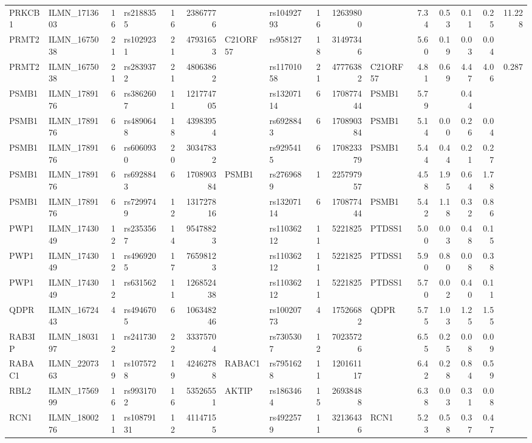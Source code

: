 \documentclass{article}
\begin{document}
\begin{landscape}
{\begin{ThreePartTable}
\begin{longtable}{|llr|lrrl|lrrl|rrrr|r|}
PRKCB1 & ILMN\_1713603 & 16 & rs2188355 & 16 & 23867776 &  & rs10492793 & 16 & 12639800 &  & 7.34 & 0.53 & 0.11 & 0.25 & 11.228 \\
PRMT2 & ILMN\_1675038 & 21 & rs1029231 & 21 & 47931653 & C21ORF57 & rs958127 & 18 & 31497346 &  & 5.60 & 0.19 & 0.03 & 0.04 &  \\
PRMT2 & ILMN\_1675038 & 21 & rs2839372 & 21 & 48063862 &  & rs11701058 & 21 & 47776382 & C21ORF57 & 4.81 & 0.69 & 4.47 & 4.06 & 0.287 \\
PSMB1 & ILMN\_1789176 & 6 & rs3862607 & 11 & 121774705 &  & rs13207114 & 6 & 170877444 & PSMB1 & 5.79 &  & 0.44 &  &  \\
PSMB1 & ILMN\_1789176 & 6 & rs4890648 & 18 & 43983954 &  & rs6928843 & 6 & 170890384 & PSMB1 & 5.14 & 0.00 & 0.26 & 0.04 &  \\
PSMB1 & ILMN\_1789176 & 6 & rs6060930 & 20 & 30347832 &  & rs9295415 & 6 & 170823379 & PSMB1 & 5.44 & 0.44 & 0.21 & 0.27 &  \\
PSMB1 & ILMN\_1789176 & 6 & rs6928843 & 6 & 170890384 & PSMB1 & rs2769689 & 1 & 225797957 &  & 4.58 & 1.95 & 0.64 & 1.78 &  \\
PSMB1 & ILMN\_1789176 & 6 & rs7299749 & 12 & 131727816 &  & rs13207114 & 6 & 170877444 & PSMB1 & 5.42 & 1.18 & 0.32 & 0.86 &  \\
PWP1 & ILMN\_1743049 & 12 & rs2353567 & 14 & 95478823 &  & rs11036212 & 11 & 5221825 & PTDSS1 & 5.00 & 0.03 & 0.48 & 0.15 &  \\
PWP1 & ILMN\_1743049 & 12 & rs4969205 & 17 & 76598123 &  & rs11036212 & 11 & 5221825 & PTDSS1 & 5.90 & 0.80 & 0.08 & 0.38 &  \\
PWP1 & ILMN\_1743049 & 12 & rs631562 & 11 & 126852438 &  & rs11036212 & 11 & 5221825 & PTDSS1 & 5.70 & 0.02 & 0.40 & 0.11 &  \\
QDPR & ILMN\_1672443 & 4 & rs4946705 & 6 & 106348246 &  & rs10020773 & 4 & 17526682 & QDPR & 5.75 & 1.03 & 1.25 & 1.55 &  \\
RAB3IP & ILMN\_1803197 & 12 & rs241730 & 22 & 33375704 &  & rs7305307 & 12 & 70235726 &  & 6.55 & 0.25 & 0.08 & 0.09 &  \\
RABAC1 & ILMN\_2207363 & 19 & rs1075728 & 19 & 42462788 & RABAC1 & rs7951628 & 11 & 120161117 &  & 6.42 & 0.28 & 0.84 & 0.59 &  \\
RBL2 & ILMN\_1756999 & 16 & rs9931702 & 16 & 53526551 & AKTIP & rs1863464 & 15 & 26938488 &  & 6.38 & 0.03 & 0.31 & 0.08 &  \\
RCN1 & ILMN\_1800276 & 11 & rs10879131 & 12 & 41147155 &  & rs4922579 & 11 & 32136436 & RCN1 & 5.23 & 0.58 & 0.37 & 0.47 &  \\

\end{longtable}
\end{ThreePartTable}}
\end{landscape}
\end{document}
